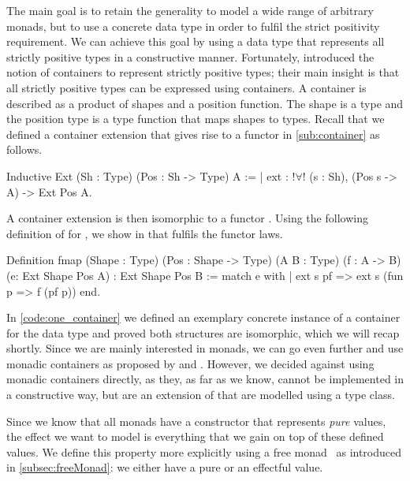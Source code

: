 The main goal is to retain the generality to model a wide range of arbitrary monads, but to use a concrete data type in order to fulfil the strict positivity requirement.
We can achieve this goal by using a data type that represents all strictly positive types in a constructive manner.
Fortunately, \citet{abbott2003categories} introduced the notion of containers to represent strictly positive types; their main insight is that all strictly positive types can be expressed using containers.
A container is described as a product of shapes and a position function.
The shape is a type  and the position type  is a type function that maps shapes to types.
Recall that we defined a container extension that gives rise to a functor in \autoref{sub:container} as follows.

\begin{coqcode}
Inductive Ext (Sh : Type) (Pos : Sh -> Type) A :=
| ext : !$\forall$! (s : Sh), (Pos s -> A) -> Ext Pos A.
\end{coqcode}

A container extension  is then isomorphic to a functor
.
Using the following definition of  for , we show
in  that  fulfils the functor
laws.

\begin{coqcode}
Definition fmap (Shape : Type) (Pos : Shape -> Type) (A B : Type)
    (f : A -> B) (e: Ext Shape Pos A) : Ext Shape Pos B :=
    match e with
    | ext s pf => ext s (fun p => f (pf p))
    end.
\end{coqcode}

In \autoref{code:one_container} we defined an exemplary concrete instance of a container for the data type  and proved both structures are isomorphic, which we will recap shortly.
Since we are mainly interested in monads, we can go even further and use monadic containers as proposed by \citet{altenkirch2017monadic} and \citet{uustalu2017partiality}.
However, we decided against using monadic containers directly, as they, as far as we know, cannot be implemented in a constructive way, but are an extension of  that are modelled using a type class.

Since we know that all monads have a constructor that represents \emph{pure} values, the effect we want to model is everything that we gain on top of these defined values.
We define this property more explicitly using a free monad~\citep{swierstra2008data} as introduced in \autoref{subsec:freeMonad}: we either have a pure or an effectful value.

